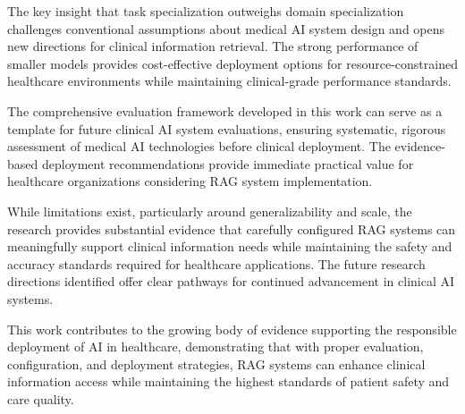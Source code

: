The key insight that task specialization outweighs domain specialization challenges conventional assumptions about medical AI system design and opens new directions for clinical information retrieval. The strong performance of smaller models provides cost-effective deployment options for resource-constrained healthcare environments while maintaining clinical-grade performance standards.

The comprehensive evaluation framework developed in this work can serve as a template for future clinical AI system evaluations, ensuring systematic, rigorous assessment of medical AI technologies before clinical deployment. The evidence-based deployment recommendations provide immediate practical value for healthcare organizations considering RAG system implementation.

While limitations exist, particularly around generalizability and scale, the research provides substantial evidence that carefully configured RAG systems can meaningfully support clinical information needs while maintaining the safety and accuracy standards required for healthcare applications. The future research directions identified offer clear pathways for continued advancement in clinical AI systems.

This work contributes to the growing body of evidence supporting the responsible deployment of AI in healthcare, demonstrating that with proper evaluation, configuration, and deployment strategies, RAG systems can enhance clinical information access while maintaining the highest standards of patient safety and care quality.
